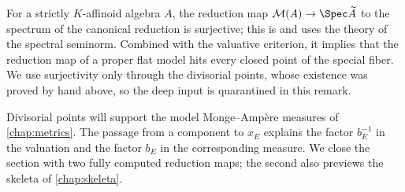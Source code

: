 \begin{remark}
\label{rem:berk-reduction-surjective}
For a strictly $K$-affinoid algebra $A$, the reduction map
$\mathcal M(A)\to\Spec\widetilde A$ to the spectrum of the canonical
reduction is surjective; this is \cite[Proposition~2.4.4]{Berk12} and
uses the theory of the spectral seminorm.  Combined with the valuative
criterion, it implies that the reduction map of a proper flat model hits
every closed point of the special fiber.  We use surjectivity only
through the divisorial points, whose existence was proved by hand above,
so the deep input is quarantined in this remark.
\end{remark}

Divisorial points will support the model Monge--Amp\`ere measures of
\cref{chap:metrics}. The passage from a component to $x_E$ explains the factor
$b_E^{-1}$ in the valuation and the factor $b_E$ in the corresponding
measure.  We close the section with two fully computed reduction maps;
the second also previews the skeleta of \cref{chap:skeleta}.

